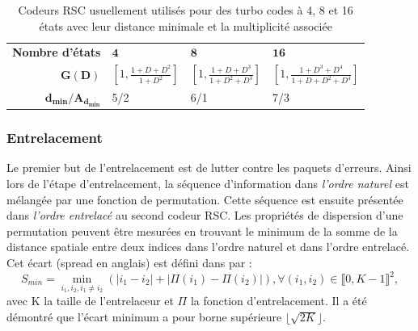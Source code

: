 \begin{table}[h]
	\centering
	\renewcommand{\arraystretch}{1.4}
	\begin{tabular}{rlll}
		\toprule
		\textbf{Nombre d'états}       & $\mathbf{4}$                           & $\mathbf{8}$                               & $\mathbf{16}$                                  \\ 
		\cmidrule(l){2-2} \cmidrule(l){3-3} \cmidrule(l){4-4}
		$\mathbf{G(D)}$                & $\left[1,\frac{1+D+D^2}{1+D^2}\right]$ & $\left[1,\frac{1+D+D^3}{1+D^2+D^3}\right]$ & $\left[1,\frac{1+D^3+D^4}{1+D+D^2+D^4}\right]$ \\
		$\mathbf{d_{min}/A_{d_{min}}}$ & 5/2                                    & 6/1                                        & 7/3                                            \\ \bottomrule
	\end{tabular}
	\caption{Codeurs RSC usuellement utilisés pour des turbo codes à 4, 8 et 16 états avec leur distance minimale et la multiplicité associée}
	\label{tab:bestRSC}
\end{table}

\subsubsection{Entrelacement}\label{sec:entrelacement}
Le premier but de l'entrelacement est de lutter contre les paquets d'erreurs. Ainsi lors de l'étape d'entrelacement, la 
séquence d'information dans \emph{l'ordre naturel} est mélangée par une fonction de permutation. Cette séquence est ensuite 
présentée dans \emph{l'ordre entrelacé} au second codeur RSC. Les propriétés de dispersion d'une permutation peuvent être mesurées en trouvant le minimum de la somme de la distance spatiale entre deux indices dans l'ordre naturel et dans l'ordre entrelacé. Cet écart (spread en anglais) est défini dans \cite{crozier2000new} par : 
\[S_{min} = \min\limits_{i_1, i_2, i_1 \ne i_2} \left( |i_1 - i_2| + |\Pi(i_1) - \Pi(i_2)| \right), \forall (i_1, i_2) \in \llbracket 0, K-1 \rrbracket ^2, \]
avec K la taille de l'entrelaceur et $\Pi$ la fonction d'entrelacement. 
Il a été démontré \cite{crozier2000new} que l'écart minimum a pour borne supérieure $\lfloor{\sqrt{2K}}\rfloor $.

